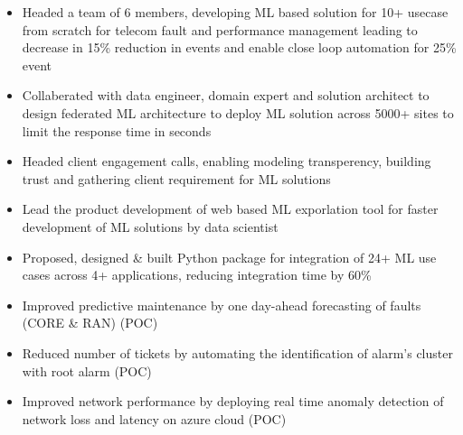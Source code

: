 \documentclass[10pt,a4paper,ragged2e,withhyper]{altacv}
\author{Madhusudan Kumar}
\date{\today}
\title{}
\begin{document}

\makecvheader

\begin{paracol}{2}
\label{sec:orgb71bfc8}
\begin{itemize}
\item Headed a team of 6 members, developing ML based solution for 10+ usecase from scratch for telecom fault and performance management leading to decrease in 15\% reduction in events and enable close loop automation for 25\% event
\item Collaberated with data engineer, domain expert and solution architect to design federated ML architecture to deploy ML solution across 5000+ sites to limit the response time in seconds
\item Headed client engagement calls, enabling modeling transperency, building trust and gathering client requirement for ML solutions
\item Lead the product development of web based ML exporlation tool for faster development of ML solutions by data scientist
\end{itemize}

\par\divider
{}
\begin{itemize}
\item Proposed, designed \& built Python package for integration of 24+ ML use cases across 4+ applications, reducing integration time by 60\%
\end{itemize}

\begin{itemize}
\item Improved predictive maintenance by one day-ahead forecasting of faults (CORE \& RAN) (POC)
\item Reduced number of tickets by automating the identification of alarm’s cluster with root alarm (POC)
\item Improved network performance by deploying real time anomaly detection of network loss and latency on azure cloud (POC)
\end{itemize}


\end{paracol}
\end{document}
